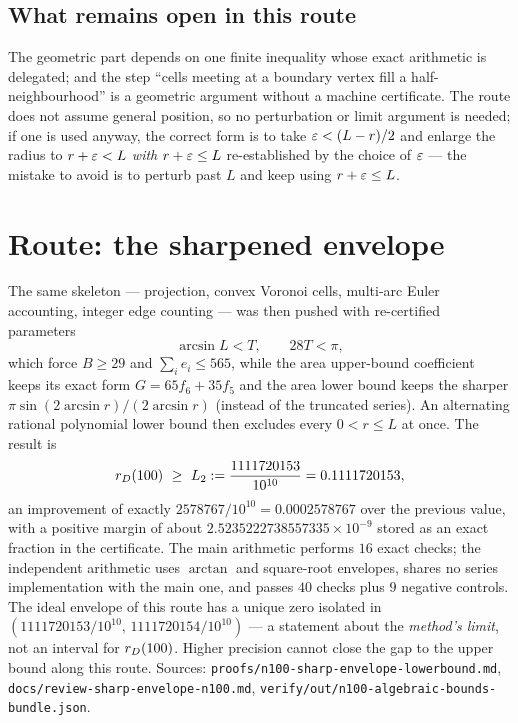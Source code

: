 \subsection{What remains open in this route}

The geometric part depends on one finite inequality whose exact arithmetic is delegated; and the
step ``cells meeting at a boundary vertex fill a half-neighbourhood'' is a geometric argument
without a machine certificate. The route does not assume general position, so no perturbation or
limit argument is needed; if one is used anyway, the correct form is to take
$\varepsilon<(L-r)/2$ and enlarge the radius to $r+\varepsilon<L$ \emph{with} $r+\varepsilon\le L$ re-established by the
choice of $\varepsilon$ --- the mistake to avoid is to perturb past $L$ and keep using $r+\varepsilon\le L$.

\section{Route: the sharpened envelope}

The same skeleton --- projection, convex Voronoi cells, multi-arc Euler accounting, integer edge
counting --- was then pushed with re-certified parameters
\[
\arcsin L<T,\qquad 28T<\pi,
\]
which force $B\ge29$ and $\sum_ie_i\le565$, while the area upper-bound coefficient keeps its exact
form $G=65f_6+35f_5$ and the area lower bound keeps the sharper
$\pi\sin(2\arcsin r)/(2\arcsin r)$ (instead of the truncated series). An alternating rational
polynomial lower bound then excludes every $0<r\le L$ at once. The result is
\[
\rD(100)\ \ge\ L_2:=\frac{1111720153}{10^{10}}=0.1111720153 ,
\]
an improvement of exactly $2578767/10^{10}=0.0002578767$ over the previous value, with a positive
margin of about $2.5235222738557335\times10^{-9}$ stored as an exact fraction in the certificate.
The main arithmetic performs $16$ exact checks; the independent arithmetic uses $\arctan$ and
square-root envelopes, shares no series implementation with the main one, and passes $40$ checks
plus $9$ negative controls. The ideal envelope of this route has a unique zero isolated in
$(1111720153/10^{10},\,1111720154/10^{10})$ --- a statement about the \emph{method's limit}, not an
interval for $r_{D}(100)$. Higher precision cannot close the gap to the upper bound along this route.
Sources: \texttt{proofs/\allowbreak{}n100-\allowbreak{}sharp-\allowbreak{}envelope-\allowbreak{}lowerbound.md},
\texttt{docs/\allowbreak{}review-\allowbreak{}sharp-\allowbreak{}envelope-\allowbreak{}n100.md},
\texttt{verify/\allowbreak{}out/\allowbreak{}n100-\allowbreak{}algebraic-\allowbreak{}bounds-\allowbreak{}bundle.json}.


